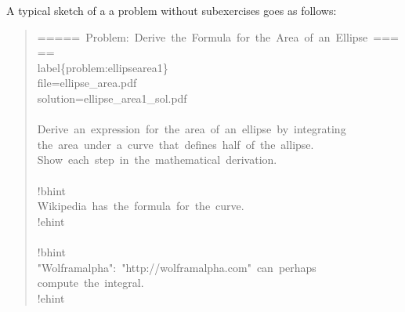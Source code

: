 \documentclass[a4paper]{article}
\begin{document}
A typical sketch of a a problem without subexercises goes as follows:
%
\begin{quote}{\ttfamily \raggedright \noindent
=====~Problem:~Derive~the~Formula~for~the~Area~of~an~Ellipse~=====\\
label\{problem:ellipsearea1\}\\
file=ellipse\_area.pdf\\
solution=ellipse\_area1\_sol.pdf\\
~\\
Derive~an~expression~for~the~area~of~an~ellipse~by~integrating\\
the~area~under~a~curve~that~defines~half~of~the~allipse.\\
Show~each~step~in~the~mathematical~derivation.\\
~\\
!bhint\\
Wikipedia~has~the~formula~for~the~curve.\\
!ehint\\
~\\
!bhint\\
"Wolframalpha":~"http://wolframalpha.com"~can~perhaps\\
compute~the~integral.\\
!ehint
}
\end{quote}
\end{document}
